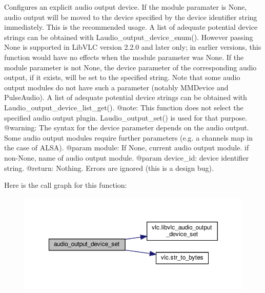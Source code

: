 \begin{DoxyVerb}Configures an explicit audio output device.
If the module paramater is None, audio output will be moved to the device
specified by the device identifier string immediately. This is the
recommended usage.
A list of adequate potential device strings can be obtained with
L{audio_output_device_enum}().
However passing None is supported in LibVLC version 2.2.0 and later only;
in earlier versions, this function would have no effects when the module
parameter was None.
If the module parameter is not None, the device parameter of the
corresponding audio output, if it exists, will be set to the specified
string. Note that some audio output modules do not have such a parameter
(notably MMDevice and PulseAudio).
A list of adequate potential device strings can be obtained with
L{audio_output_device_list_get}().
@note: This function does not select the specified audio output plugin.
L{audio_output_set}() is used for that purpose.
@warning: The syntax for the device parameter depends on the audio output.
Some audio output modules require further parameters (e.g. a channels map
in the case of ALSA).
@param module: If None, current audio output module. if non-None, name of audio output module.
@param device_id: device identifier string.
@return: Nothing. Errors are ignored (this is a design bug).
\end{DoxyVerb}
 Here is the call graph for this function\+:
\nopagebreak
\begin{figure}[H]
\begin{center}
\leavevmode
\includegraphics[width=350pt]{classvlc_1_1_media_player_aa3acdfd10aed7948cf6d53a1d6f55660_cgraph}
\end{center}
\end{figure}
\mbox{\label{classvlc_1_1_media_player_afe8f532333eb1d961d285d3bb74df20c}} 
